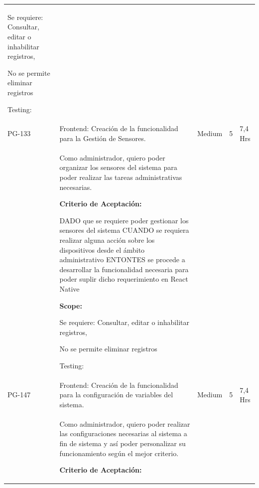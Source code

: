 \documentclass[11pt]{charter}
\begin{document}
\begin{landscape}
\begin{tabularx}{\linewidth}{@{}|p{1.3cm}|p{17cm}|p{1.7cm}|p{1.5cm}|p{1.7cm}|@{}}
\begin{description}
                         \item Se requiere: Consultar, editar o inhabilitar registros, 
                         \item No se permite eliminar registros                 
                    \item Testing:
            \end{description}           &  &     & \\
PG-133   & Frontend: Creación de la   funcionalidad para la Gestión de Sensores.                & Medium             & 5   & 7,4  Hrs          \\
         &  \begin{description}                 
                   \item Como administrador, quiero poder   organizar los sensores del sistema para poder realizar las tareas   administrativas necesarias.                 
                   \item \textbf{Criterio de Aceptación:}                 
                   \item DADO que se requiere poder gestionar los sensores del sistema CUANDO se requiera realizar alguna acción sobre los dispositivos desde el   ámbito administrativo ENTONTES se procede a desarrollar la funcionalidad necesaria para poder   suplir dicho requerimiento en React Native                
                   \item \textbf{Scope:}                  
                         \item Se requiere: Consultar, editar o inhabilitar registros, 
                         \item No se permite eliminar registros                 
                   \item Testing:
            \end{description}         &  &     & \\
PG-147   & Frontend: Creación de la   funcionalidad para la configuración de variables del sistema.               & Medium             & 5   & 7,4  Hrs          \\
         &  \begin{description}                 
                   \item Como administrador, quiero poder   realizar las configuraciones necesarias al sistema a fin de sistema y así   poder personalizar su funcionamiento según el mejor criterio.                 
                   \item \textbf{Criterio de Aceptación:}                 

\end{description}
\end{tabularx}
\end{landscape}
\end{document}
